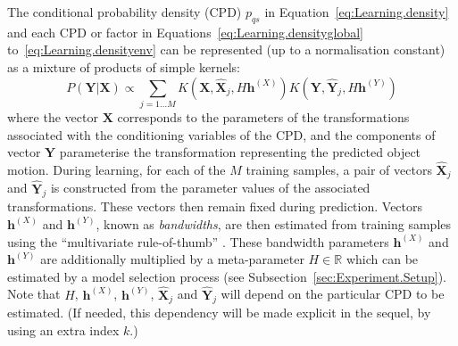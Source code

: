
The conditional probability density (CPD) $p_{qs}$ in Equation~\eqref{eq:Learning.density} and each CPD or factor in
Equations~\eqref{eq:Learning.densityglobal} to~\eqref{eq:Learning.densityenv}
can be represented (up to a normalisation constant) as a mixture of products of simple kernels:
\begin{equation}
P(\mathbf{Y}|\mathbf{X}) \propto
\mathop{\sum}_{j=1 \ldots M}
K(\mathbf{X}, \hat{\mathbf{X}}_j, H \mathbf{h}^{(X)})
K(\mathbf{Y}, \hat{\mathbf{Y}}_j, H \mathbf{h}^{(Y)})
\label{eq:Density.Estimation.mixture}
\end{equation}
\noindent where the vector $\mathbf{X}$ corresponds to the parameters of the transformations associated with the conditioning variables of the CPD, and the components of vector $\mathbf{Y}$ parameterise the transformation representing the predicted object motion. During learning, for each of the $M$ training samples,
a pair of vectors $\hat{\mathbf{X}}_j$ and $\hat{\mathbf{Y}}_j$
is constructed from the parameter values of the associated transformations. These vectors then remain fixed during prediction.
Vectors $\mathbf{h}^{(X)}$ and $\mathbf{h}^{(Y)}$, known as \textit{bandwidths}, are then estimated from training samples using
the ``multivariate rule-of-thumb'' \cite{scott2004multi-dimensional}.
These bandwidth parameters $\mathbf{h}^{(X)}$ and $\mathbf{h}^{(Y)}$ are additionally multiplied by a meta-parameter $H \in \mathbb{R}$ which can be estimated by a model selection process (see Subsection~\ref{sec:Experiment.Setup}). Note that $H$, $\mathbf{h}^{(X)}$, $\mathbf{h}^{(Y)}$, $\hat{\mathbf{X}}_j$
and $\hat{\mathbf{Y}}_j$ will depend on the particular CPD to be estimated. (If needed, this dependency will be made explicit in the sequel, by using an extra index $k$.)

